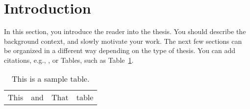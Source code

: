 
\section{Introduction}
\label{sec:thesis_introduction}  %

In this section, you introduce the reader into the thesis. You should describe the background context, and slowly motivate your work.
The next few sections can be organized in a different way depending on the type of thesis.
You can add citations, e.g., \cite{goodfellow2014generative}, or Tables, such as Table~\ref{tab:title_please_change_me}. 

 \begin{table}[!h]
    \caption{This is a sample table.}
    \centering
     \begin{tabular}{|c |c| c|c|} 
       This & and & That & table\\
     \end{tabular}
     \label{tab:title_please_change_me}
\end{table}
